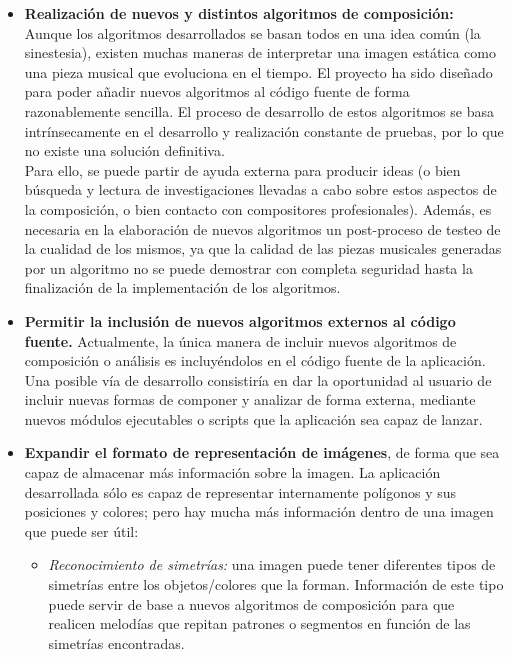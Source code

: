 \begin{itemize}

\item\textbf{Realización de nuevos y distintos algoritmos de composición:} Aunque los algoritmos desarrollados se basan todos en una idea común (la sinestesia), existen muchas maneras de interpretar una imagen estática como una pieza musical que evoluciona en el tiempo. El proyecto ha sido diseñado para poder añadir nuevos algoritmos
al código fuente de forma razonablemente sencilla. El proceso de desarrollo de estos algoritmos se basa intrínsecamente en el desarrollo y realización constante de pruebas, por lo que no existe una solución definitiva.\\

Para ello, se puede partir de ayuda externa para producir ideas (o bien búsqueda y lectura de investigaciones llevadas a cabo sobre estos aspectos de la composición, o bien contacto con compositores profesionales). Además, es necesaria en la elaboración de nuevos algoritmos un post-proceso de testeo de la cualidad de los mismos, ya que la calidad de las piezas musicales generadas por un algoritmo no se puede demostrar con completa seguridad hasta la finalización de la implementación de los algoritmos.

\item\textbf{Permitir la inclusión de nuevos algoritmos externos al código fuente.} Actualmente, la única manera de incluir nuevos algoritmos de composición o análisis es incluyéndolos en el código fuente de la aplicación. Una posible vía de desarrollo consistiría en dar la oportunidad al usuario de incluir nuevas formas de componer y analizar de forma externa, mediante nuevos módulos ejecutables o scripts que la aplicación sea capaz de lanzar.\\

\item\textbf{Expandir el formato de representación de imágenes}, de forma que sea capaz de almacenar más información sobre la imagen. La aplicación desarrollada sólo es capaz de representar internamente polígonos y sus posiciones y colores; pero hay mucha más información dentro de una imagen que puede ser útil:

	\begin{itemize}
	
		\item\textit{Reconocimiento de simetrías:} una imagen puede tener diferentes tipos de simetrías entre los objetos/colores que la forman. Información de este tipo puede servir de base a nuevos algoritmos de composición para que realicen melodías que repitan patrones o segmentos en función de las simetrías encontradas.
		

\end{itemize}
\end{itemize}
